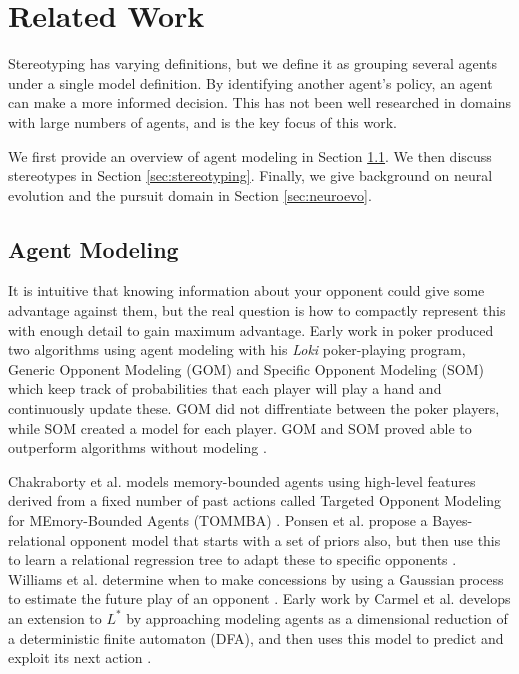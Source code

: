 \documentclass{aamas2014}
\begin{document}
\section{Related Work}
\label{sec:relatedwork}

Stereotyping has varying definitions, but we define it as grouping several agents under a single model definition. By identifying another agent's policy, an agent can make a more informed decision. This has not been well researched in domains with large numbers of agents, and is the key focus of this work.

We first provide an overview of agent modeling in Section \ref{sec:agentmodeling}. We then discuss stereotypes in Section \ref{sec:stereotyping}. Finally, we give background on neural evolution and the pursuit domain in Section \ref{sec:neuroevo}.

\subsection{Agent Modeling}
\label{sec:agentmodeling}

It is intuitive that knowing information about your opponent could give some advantage against them, but the real question is how to compactly represent this with enough detail to gain maximum advantage. Early work in poker produced two algorithms using agent modeling with his \emph{Loki} poker-playing program, Generic Opponent Modeling (GOM) and Specific Opponent Modeling (SOM) which keep track of probabilities that each player will play a hand and continuously update these. GOM did not diffrentiate between the poker players, while SOM created a model for each player. GOM and SOM proved able to outperform algorithms without modeling \cite{Loki}.

Chakraborty et al. models memory-bounded agents using high-level features derived from a fixed number of past actions called Targeted Opponent Modeling for MEmory-Bounded Agents (TOMMBA) \cite{TOMMBA}. Ponsen et al. propose a Bayes-relational opponent model that starts with a set of priors also, but then use this to learn a relational regression tree to adapt these to specific opponents \cite{Ponsen}. Williams et al. determine when to make concessions by using a Gaussian process to estimate the future play of an opponent \cite{Williams}. Early work by Carmel et al. develops an extension to $L^*$ by approaching modeling agents as a dimensional reduction of a deterministic finite automaton (DFA), and then uses this model to predict and exploit its next action \cite{Carmel}.
\end{document}
